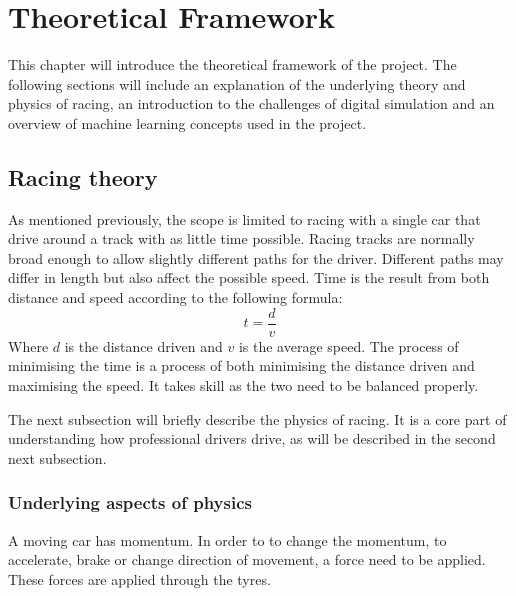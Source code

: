 \chapter{Theoretical Framework}
This chapter will introduce the theoretical framework of the project. The following sections will include an explanation of the underlying theory and physics of racing, an introduction to the challenges of digital simulation and an overview of machine learning concepts used in the project. 

\section{Racing theory}

As mentioned previously, the scope is limited to racing with a single car that drive around a track with as little time possible. Racing tracks are normally broad enough to allow slightly different paths for the driver. Different paths may differ in length but also affect the possible speed. Time is the result from both distance and speed according to the following formula:
\begin{equation}
t = \frac{d}{v}
\end{equation}
Where $d$ is the distance driven and $v$ is the average speed. The process of minimising the time is a process of both minimising the distance driven and maximising the speed. It takes skill as the two need to be balanced properly.

The next subsection will briefly describe the physics of racing. It is a core part of understanding how professional drivers drive, as will be described in the second next subsection.

\subsection{Underlying aspects of physics}
A moving car has momentum. In order to to change the momentum, to accelerate, brake or change direction of movement, a force need to be applied. These forces are applied through the tyres. 

